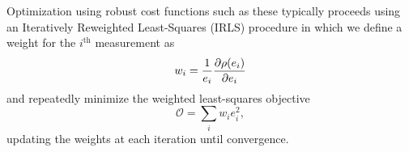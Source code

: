 Optimization using robust cost functions such as these typically proceeds using an Iteratively Reweighted Least-Squares (IRLS) procedure in which we define a weight for the $i^{\text{th}}$ measurement as
\begin{equation}
    w_i = \frac{1}{e_i}\dfrac{\partial \rho(e_i)}{\partial e_i}
\end{equation}
and repeatedly minimize the weighted least-squares objective
\begin{equation}
    \mathcal{O} = \sum_i w_i e_i^2,
\end{equation}
updating the weights at each iteration until convergence.

